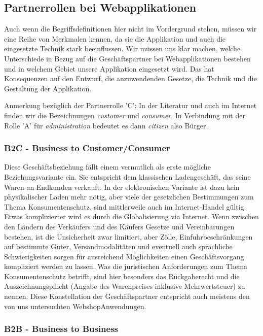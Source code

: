 \subsection{Partnerrollen bei Webapplikationen}

Auch wenn die Begriffsdefinitionen hier nicht im Vordergrund stehen, müssen
wir eine Reihe von Merkmalen kennen, da sie die Applikation und auch die
eingesetzte Technik stark beeinflussen. Wir müssen uns klar machen, welche
Unterschiede in Bezug auf die Geschäftspartner bei Webapplikationen bestehen
und in welchem Gebiet unsere Applikation eingesetzt wird. Das hat Konsequenzen
auf den Entwurf, die anzuwendenden Gesetze, die Technik und die Gestaltung
der Applikation.

Anmerkung bezüglich der Partnerrolle 'C': In der Literatur
und auch im Internet finden wir die Bezeichnungen \emph{customer} und \emph{consumer}.
In Verbindung mit der Rolle 'A' für \emph{administration} bedeutet es dann
\emph{citizen} also Bürger.

\subsubsection*{B2C - Business to Customer/Consumer}

Diese Geschäftsbeziehung fällt einem vermutlich als erste mögliche Beziehungsvariante
ein. Sie entspricht dem klassischen Ladengeschäft, das seine Waren an Endkunden
verkauft. In der elektronischen Variante ist dazu kein physikalischer Laden mehr
nötig, aber viele der gesetzlichen Bestimmungen zum Thema Konsumentenschutz, sind
mittlerweile auch im Internet-Handel gültig. Etwas komplizierter wird es durch die
Globalisierung via Internet. Wenn zwischen den Ländern des Verkäufers und des Käufers
Gesetze und Vereinbarungen bestehen, ist die Unsicherheit zwar limitiert, aber Zölle,
Einfuhrbeschränkungen auf bestimmte Güter, Versandmodalitäten und eventuell auch
sprachliche Schwierigkeiten sorgen für ausreichend Möglichkeiten einen Geschäftsvorgang
kompliziert werden zu lassen. Was die juristischen Anforderungen zum Thema
Konsumentenschutz betrifft, sind hier besonders das Rückgaberecht und die
Auszeichnungspflicht (Angabe des Warenpreises inklusive Mehrwertsteuer) zu nennen.
Diese Konstellation der Geschäftspartner entspricht auch meistens den von uns
untersuchten WebshopAnwendungen.

\subsubsection*{B2B - Business to Business}

